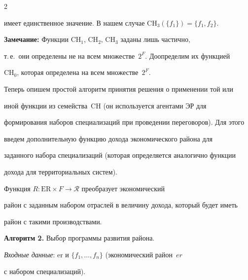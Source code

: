 \begin{multicols}{2}
\begin{enumerate}[1)]
имеет единственное значение. В нашем случае CH$_3(\{f_1\})=\{f_1,f_2\}$.


\end{enumerate}








\noindent


\textbf{Замечание:} Функции CH$_1$, CH$_2$, CH$_3$ заданы лишь частично, 


т.\,е.\ они определены не на всем множестве~$2^F$. Доопределим их функцией 


CH$_0$, которая определена на всем множестве~$2^F$. 


  


  \smallskip


  


  Теперь опишем простой алгоритм принятия решения о применении той или 


иной функции из семейства~CH (он используется агентами ЭР для 


формирования наборов специализаций при проведении переговоров). Для этого 


введем дополнительную функцию дохода экономического района для 


заданного набора специализаций (которая определяется аналогично функции 


дохода для территориальных систем).


  Функция $R: \mathrm{ER}\times F\rightarrow \mathcal{R}$ преобразует экономический 


район с заданным набором отраслей в величину дохода, который будет иметь 


район с такими производствами.





\medskip





\noindent


\textbf{Алгоритм 2.} Выбор программы развития района.





\textit{Входные данные}: er и $\{f_1, \ldots ,f_n\}$ (экономический район~$er$ 


с набором специализаций).


  



\end{multicols}
